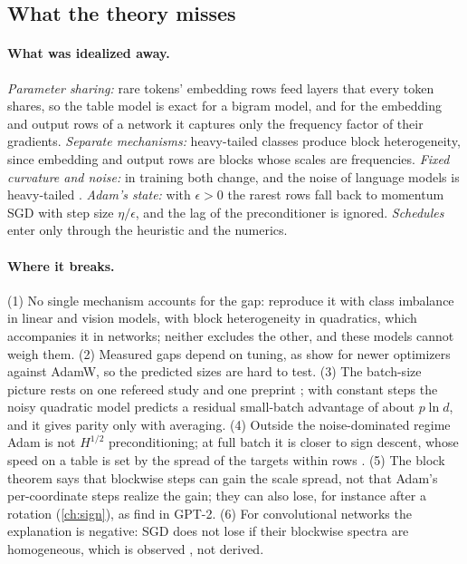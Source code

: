 \begin{refsection}
\section{What the theory misses}\label{sec:transformers:misses}

\paragraph{What was idealized away.} \emph{Parameter sharing:} rare tokens' embedding rows feed layers that every token shares, so the table model is exact for a bigram model, and for the embedding and output rows of a network it captures only the frequency factor of their gradients. \emph{Separate mechanisms:} heavy-tailed classes produce block heterogeneity, since embedding and output rows are blocks whose scales are frequencies. \emph{Fixed curvature and noise:} in training both change, and the noise of language models is heavy-tailed \parencite{ZhangEtAl2020}. \emph{Adam's state:} with $\epsilon>0$ the rarest rows fall back to momentum SGD with step size $\eta/\epsilon$, and the lag of the preconditioner is ignored. \emph{Schedules} enter only through the heuristic and the numerics.

\paragraph{Where it breaks.} (1) No single mechanism accounts for the gap: \textcite{KunstnerEtAl2024} reproduce it with class imbalance in linear and vision models, \textcite{ZhangEtAl2024} with block heterogeneity in quadratics, which accompanies it in networks; neither excludes the other, and these models cannot weigh them. (2) Measured gaps depend on tuning, as \textcite{WenEtAl2026Fantastic} show for newer optimizers against AdamW, so the predicted sizes are hard to test. (3) The batch-size picture rests on one refereed study \parencite{MarekEtAl2025} and one preprint \parencite{SreckovicEtAl2025}; with constant steps the noisy quadratic model predicts a residual small-batch advantage of about $p\ln d$, and it gives parity only with averaging. (4) Outside the noise-dominated regime Adam is not $H^{1/2}$ preconditioning; at full batch it is closer to sign descent, whose speed on a table is set by the spread of the targets within rows \parencite{KunstnerBach2025}. (5) The block theorem says that blockwise steps can gain the scale spread, not that Adam's per-coordinate steps realize the gain; they can also lose, for instance after a rotation (\cref{ch:sign}), as \textcite{XieEtAl2025} find in GPT-2. (6) For convolutional networks the explanation is negative: SGD does not lose if their blockwise spectra are homogeneous, which is observed \parencite{ZhangEtAl2024}, not derived.


\end{refsection}

